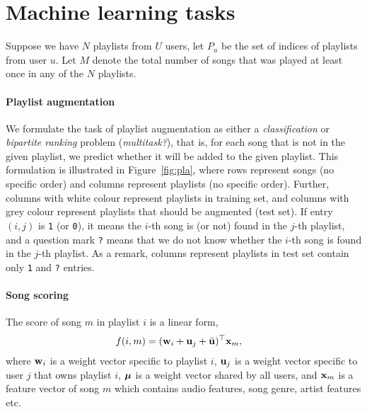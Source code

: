 \section{Machine learning tasks}

Suppose we have $N$ playlists from $U$ users, let $P_u$ be the set of indices of playlists from user $u$.
Let $M$ denote the total number of songs that was played at least once in any of the $N$ playlists.


\paragraph{Playlist augmentation}

We formulate the task of playlist augmentation as either a \emph{classification} or \emph{bipartite ranking} problem ({\it multitask?}),
that is, for each song that is not in the given playlist, 
we predict whether it will be added to the given playlist.
This formulation is illustrated in Figure~\ref{fig:pla},
where rows represent songs (no specific order) and columns represent playlists (no specific order).
Further, columns with white colour represent playlists in training set, 
and columns with grey colour represent playlists that should be augmented (\ie test set).
If entry $(i, j)$ is \texttt{1} (or \texttt{0}), 
it means the $i$-th song is (or not) found in the $j$-th playlist, 
and a question mark \texttt{?} means that we do not know whether the $i$-th song is found in the $j$-th playlist.
As a remark, columns represent playlists in test set contain only \texttt{1} and \texttt{?} entries.





\paragraph{Song scoring}

The score of song $m$ in playlist $i$ is a linear form,
\begin{equation*}
\begin{aligned}
f(i, m) &= (\mathbf{w}_i + \mathbf{u}_j + \bar{\mathbf{u}})^\top \mathbf{x}_m,
\end{aligned}
\end{equation*}
where $\mathbf{w}_i$ is a weight vector specific to playlist $i$,
$\mathbf{u}_j$ is a weight vector specific to user $j$ that owns playlist $i$,
$\bm{\mu}$ is a weight vector shared by all users,
and $\mathbf{x}_m$ is a feature vector of song $m$ which contains audio features, song genre, artist features etc.

